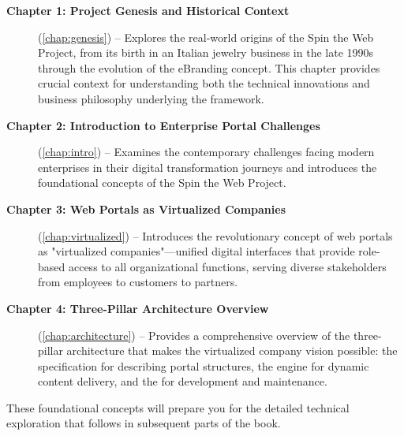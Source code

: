 \begin{description}
\item[\textbf{Chapter 1: Project Genesis and Historical Context}] (\cref{chap:genesis}) -- Explores the real-world origins of the Spin the Web Project, from its birth in an Italian jewelry business in the late 1990s through the evolution of the eBranding concept. This chapter provides crucial context for understanding both the technical innovations and business philosophy underlying the framework.

\item[\textbf{Chapter 2: Introduction to Enterprise Portal Challenges}] (\cref{chap:intro}) -- Examines the contemporary challenges facing modern enterprises in their digital transformation journeys and introduces the foundational concepts of the Spin the Web Project.

\item[\textbf{Chapter 3: Web Portals as Virtualized Companies}] (\cref{chap:virtualized}) -- Introduces the revolutionary concept of web portals as "virtualized companies"—unified digital interfaces that provide role-based access to all organizational functions, serving diverse stakeholders from employees to customers to partners.

\item[\textbf{Chapter 4: Three-Pillar Architecture Overview}] (\cref{chap:architecture}) -- Provides a comprehensive overview of the three-pillar architecture that makes the virtualized company vision possible: the \wbdl{} specification for describing portal structures, the \webspinner{} engine for dynamic content delivery, and the \studio{} for development and maintenance.
\end{description}

These foundational concepts will prepare you for the detailed technical exploration that follows in subsequent parts of the book.

